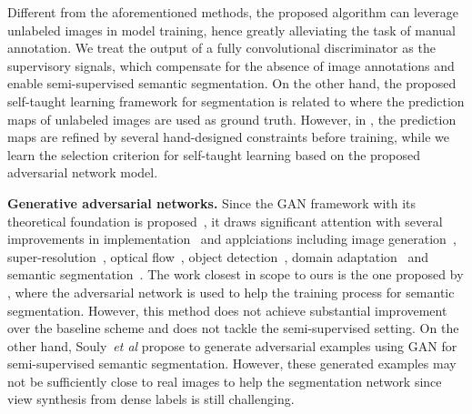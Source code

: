 \documentclass{bmvc2k}
\def\etal{\emph{et al}\bmvaOneDot}
\begin{document}
	Different from the aforementioned methods, the proposed algorithm can leverage unlabeled images in model training, hence greatly alleviating the task of manual annotation.
	We treat the output of a fully convolutional discriminator as the supervisory signals, which compensate for the absence of image annotations and enable semi-supervised semantic segmentation.
	On the other hand, the proposed self-taught learning framework for segmentation is related to \cite{pathak2015constrained} where the prediction maps of unlabeled images are used as ground truth.
	However, in \cite{pathak2015constrained}, the prediction maps are refined by several hand-designed constraints before training, while we learn the selection criterion for self-taught learning based on the proposed adversarial network model. 
	

	{\flushleft \bf Generative adversarial networks.}
	Since the GAN framework with its theoretical foundation is proposed~\cite{gan}, it draws significant attention with several improvements in implementation~\cite{dcgan,denton2015deep, arjovsky2017wasserstein, mao2016multi, berthelot2017began} and applciations
	including image generation~\cite{dcgan}, super-resolution~\cite{srgan,lai2017deep}, optical flow~\cite{lai2017semi}, object detection~\cite{fastarcnn}, domain adaptation~\cite{fcnsinthewild,Tsai_adaptseg_2018,Hoffman_cycada2017} and semantic segmentation~\cite{luc2016semantic, souly2017semi}.
	The work closest in scope to ours is the one proposed by \cite{luc2016semantic}, where the adversarial network is used to help the training process for semantic segmentation. 
	However, this method does not achieve substantial improvement over the baseline scheme 
	and does not tackle the semi-supervised setting.
	On the other hand, Souly~\etal \cite{souly2017semi} propose to generate adversarial examples using GAN for semi-supervised semantic segmentation. 
	However, these generated examples may not be sufficiently close to real images to help the segmentation network since view synthesis from dense labels is still challenging.
	
\end{document}
